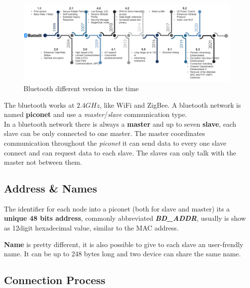 \begin{figure}[h]
    \centering
    \includegraphics[width=\textwidth]{img/bluetooth_timeline}
    \caption{Bluetooth different version in the time}
\end{figure}

The bluetooth works at $2.4GHz$, like WiFi and ZigBee. A bluetooth network is named \textbf{piconet} and use a \textit{master}/\textit{slave} communication type. \\
In a bluetooth network there is always a \textbf{master} and up to seven \textbf{slave}, each slave can be only connected to one master. The master coordinates communication throughout the \textit{piconet} it can send data to every one slave connect and can request data to each slave. The slaves can only talk with the master not between them. 

\subsection{Address \& Names}
The identifier for each node into a piconet (both for slave and master) its a \textbf{unique 48 bits address}, commonly abbreviated \textbf{\textit{BD\_ADDR}}, usually is show as 12digit hexadecimal value, similar to the MAC address.
\begin{boxA}
    \textbf{Name} is pretty different, it is also possible to give to each slave an user-frendly name. It can be up to 248 bytes long and two device can share the same name.
\end{boxA}

\subsection{Connection Process}

